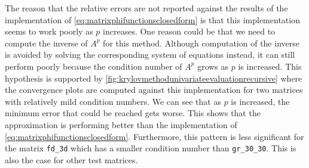 \begin{remark}
    The reason that the relative errors are not reported against the results of the implementation of
    \eqref{eq:matrixphifunctionsclosedform} is that this implementation seems to work poorly as $p$ increases.
    One reason could be that we need to compute the inverse of $A^p$ for this method. Although computation of the
    inverse is avoided by solving the corresponding system of equations instead, it can still perform poorly because
    the condition number of $A^p$ grows as $p$ is increased. This hypothesis is supported by
    \autoref{fig:krylovmethodunivariateevaluationrecursive} where the convergence plots are computed against this implementation
    for two matrices with relatively mild condition numbers. We can see that as $p$ is increased, the minimum error that could be
    reached gets worse. This shows that the approximation is performing better than the implementation of
    \eqref{eq:matrixphifunctionsclosedform}.
    Furthermore, this pattern is less significant for the matrix \texttt{fd\_3d} which has a smaller condition number
    than \texttt{gr\_30\_30}. This is also the case for other test matrices.
\end{remark}

